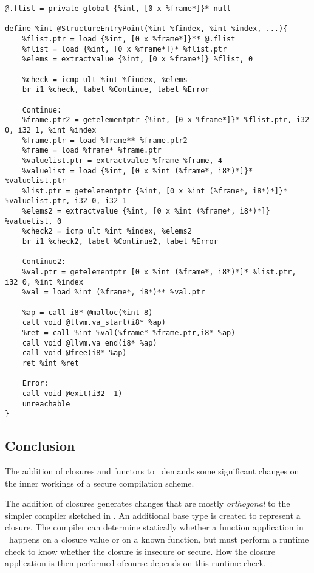 \begin{lstlisting}
@.flist = private global {%int, [0 x %frame*]}* null

define %int @StructureEntryPoint(%int %findex, %int %index, ...){
    %flist.ptr = load {%int, [0 x %frame*]}** @.flist
    %flist = load {%int, [0 x %frame*]}* %flist.ptr
    %elems = extractvalue {%int, [0 x %frame*]} %flist, 0
    
    %check = icmp ult %int %findex, %elems
    br i1 %check, label %Continue, label %Error
    
    Continue:
    %frame.ptr2 = getelementptr {%int, [0 x %frame*]}* %flist.ptr, i32 0, i32 1, %int %index
    %frame.ptr = load %frame** %frame.ptr2
    %frame = load %frame* %frame.ptr
    %valuelist.ptr = extractvalue %frame %frame, 4
    %valuelist = load {%int, [0 x %int (%frame*, i8*)*]}* %valuelist.ptr
    %list.ptr = getelementptr {%int, [0 x %int (%frame*, i8*)*]}* %valuelist.ptr, i32 0, i32 1
    %elems2 = extractvalue {%int, [0 x %int (%frame*, i8*)*]} %valuelist, 0
    %check2 = icmp ult %int %index, %elems2
    br i1 %check2, label %Continue2, label %Error
    
    Continue2:
    %val.ptr = getelementptr [0 x %int (%frame*, i8*)*]* %list.ptr, i32 0, %int %index
    %val = load %int (%frame*, i8*)** %val.ptr

    %ap = call i8* @malloc(%int 8)
    call void @llvm.va_start(i8* %ap)
    %ret = call %int %val(%frame* %frame.ptr,i8* %ap)
    call void @llvm.va_end(i8* %ap)
    call void @free(i8* %ap)
    ret %int %ret
    
    Error:
    call void @exit(i32 -1)
    unreachable
}
\end{lstlisting}
\subsection{Conclusion}
The addition of closures and functors to \MiniML\ demands some significant changes on the inner workings of a secure compilation scheme.

The addition of closures generates changes that are mostly \emph{orthogonal} to the simpler compiler sketched in .
An additional base type is created to represent a closure.
The compiler can determine statically whether a function application in \MiniML\ happens on a closure value or on a known function, but must perform a runtime check to know whether the closure is insecure or secure.
How the closure application is then performed ofcourse depends on this runtime check.


